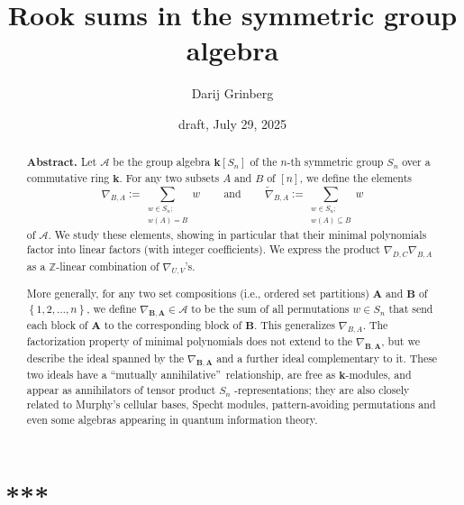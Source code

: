 \documentclass[numbers=enddot,12pt,final,onecolumn,notitlepage]{scrartcl}%
\numberwithin{exer}{subsection}
\theoremstyle{definition}
\let\sumnonlimits\sum
\renewcommand{\sum}{\sumnonlimits\limits}
\begin{document}
\title{Rook sums in the symmetric group algebra}
\author{Darij Grinberg}
\date{draft, July 29, 2025}
\maketitle

\begin{abstract}
\textbf{Abstract.} Let $\mathcal{A}$ be the group algebra $\mathbf{k}\left[
S_{n}\right]  $ of the $n$-th symmetric group $S_{n}$ over a commutative ring
$\mathbf{k}$. For any two subsets $A$ and $B$ of $\left[  n\right]  $, we
define the elements%
\[
\nabla_{B,A}:=\sum_{\substack{w\in S_{n};\\w\left(  A\right)  =B}%
}w\ \ \ \ \ \ \ \ \ \ \text{and}\ \ \ \ \ \ \ \ \ \ \widetilde{\nabla}%
_{B,A}:=\sum_{\substack{w\in S_{n};\\w\left(  A\right)  \subseteq B}}w
\]
of $\mathcal{A}$. We study these elements, showing in particular that their
minimal polynomials factor into linear factors (with integer coefficients). We
express the product $\nabla_{D,C}\nabla_{B,A}$ as a $\mathbb{Z}$-linear
combination of $\nabla_{U,V}$'s.

More generally, for any two set compositions (i.e., ordered set partitions)
$\mathbf{A}$ and $\mathbf{B}$ of $\left\{  1,2,\ldots,n\right\}  $, we define
$\nabla_{\mathbf{B},\mathbf{A}}\in\mathcal{A}$ to be the sum of all
permutations $w\in S_{n}$ that send each block of $\mathbf{A}$ to the
corresponding block of $\mathbf{B}$. This generalizes $\nabla_{B,A}$. The
factorization property of minimal polynomials does not extend to the
$\nabla_{\mathbf{B},\mathbf{A}}$, but we describe the ideal spanned by the
$\nabla_{\mathbf{B},\mathbf{A}}$ and a further ideal complementary to it.
These two ideals have a \textquotedblleft mutually
annihilative\textquotedblright\ relationship, are free as $\mathbf{k}%
$-modules, and appear as annihilators of tensor product $S_{n}$%
-representations; they are also closely related to Murphy's cellular bases,
Specht modules, pattern-avoiding permutations and even some algebras appearing
in quantum information theory.

\end{abstract}
\tableofcontents

\section*{***}
\end{document}
